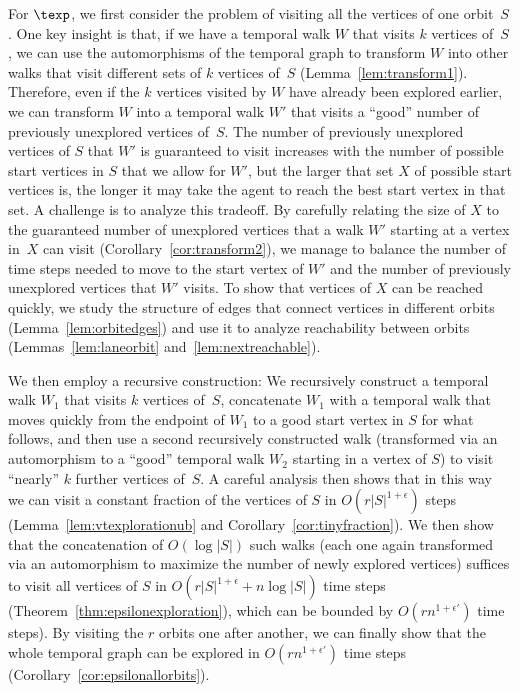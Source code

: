 For $\texp$, we first consider the problem of visiting all the vertices of one
orbit~$S$. One key insight is that, if we have a temporal walk $W$ that visits
$k$ vertices of~$S$, we can use the automorphisms of the temporal graph to
transform $W$ into other walks that visit different sets of $k$ vertices of~$S$
(Lemma~\ref{lem:transform1}).
Therefore, even if the $k$ vertices visited by $W$ have already been explored
earlier, we can transform $W$ into a temporal walk $W'$ that visits a ``good''
number of previously unexplored vertices of~$S$. The number of previously
unexplored vertices of $S$ that $W'$ is guaranteed to visit increases with the
number of possible start vertices in $S$ that we allow for $W'$, but the larger
that set $X$ of possible start vertices is, the longer it may take the agent to
reach the best start vertex in that set. A challenge is to analyze this
tradeoff. By carefully relating the size of $X$ to the guaranteed number of
unexplored vertices that a walk $W'$ starting at a vertex in~$X$ can visit
(Corollary~\ref{cor:transform2}), we
manage to balance the number of time steps needed to move to the start vertex of
$W'$ and the number of previously unexplored vertices that $W'$ visits.
To show that vertices of $X$ can be reached quickly, we study the structure
of edges that connect vertices in different orbits (Lemma~\ref{lem:orbitedges})
and use it to analyze
reachability between orbits (Lemmas~\ref{lem:laneorbit} and~\ref{lem:nextreachable}).

We then employ a recursive construction: We recursively construct a temporal
walk {$W_{1}$ that} visits $k$ vertices of~$S$, concatenate
$W_{1}$ with a temporal walk that moves quickly from the endpoint of
$W_{1}$ to a good start vertex in $S$ for what follows, and then use a second recursively constructed walk
(transformed via an automorphism to a ``good'' temporal walk
{$W_{2}$} starting in a vertex of $S$) to visit ``nearly'' $k$
further vertices of~$S$. {A careful} analysis then shows that in this way
we can visit a constant fraction of the vertices of $S$ in
$O(r|S|^{1+\epsilon})$ steps (Lemma~\ref{lem:vtexplorationub} and Corollary~\ref{cor:tinyfraction}).
We then show that the concatenation of $O(\log
|S|)$ such walks (each one again transformed via an automorphism to maximize the
number of newly explored vertices) suffices to visit all vertices of $S$ in
$O(r|S|^{1+\epsilon}+n\log |S|)$ time steps (Theorem~\ref{thm:epsilonexploration}),
which can be bounded by $O(r
n^{1+\epsilon'})$ time steps). By visiting the $r$ orbits one after another, we
can finally show that the whole temporal graph can be explored in
$O(r n^{1+\epsilon'})$ time steps (Corollary~\ref{cor:epsilonallorbits}).

